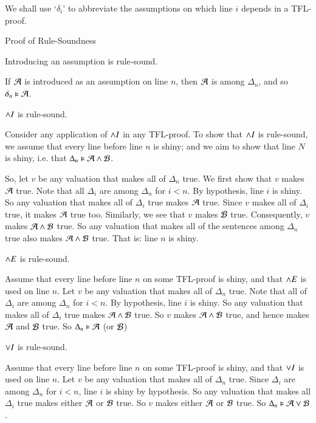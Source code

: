 \documentclass[12pt, a4paper, twoside, openright, titlepage]{book}
\begin{document}
\begin{rmk}{}{}
    We shall use `$\delta_i$' to abbreviate the assumptions on which line $i$ depends in a TFL-proof.
\end{rmk}

\begin{proof*}{Proof of Rule-Soundness}{}
    \begin{claim*}{1}{}
        Introducing an assumption is rule-sound.
    \end{claim*}
    If $\mathcal{A}$ is introduced as an assumption on line $n$, then $\mathcal{A}$ is among $\Delta_n$, and so $\delta_n \vDash \mathcal{A}$.

    \begin{claim*}{2}{}
        $\wedge I$ is rule-sound.
    \end{claim*}
    Consider any application of $\wedge I$ in any TFL-proof. To show that $\wedge I$ is rule-sound, we assume that every line before line $n$ is shiny; and we aim to show that line $N$ is shiny, i.e. that $\Delta_n \vDash \mathcal{A}\wedge \mathcal{B}$.

    So, let $v$ be any valuation that makes all of $\Delta_n$ true. We first show that $v$ makes $\mathcal{A}$ true. Note that all $\Delta_i$ are among $\Delta_n$ for $i< n$. By hypothesis, line $i$ is shiny. So any valuation that makes all of $\Delta_i$ true makes $\mathcal{A}$ true. Since $v$ makes all of $\Delta_i$ true, it makes $\mathcal{A}$ true too. Similarly, we see that $v$ makes $\mathcal{B}$ true. Consequently, $v$ makes $\mathcal{A} \wedge\mathcal{B}$ true. So any valuation that makes all of the sentences among $\Delta_n$ true also makes $\mathcal{A}\wedge\mathcal{B}$ true. That is: line $n$ is shiny.


    \begin{claim*}{3}{}
        $\wedge E$ is rule-sound.
    \end{claim*}
    Assume that every line before line $n$ on some TFL-proof is shiny, and that $\wedge E$ is used on line $n$. Let $v$ be any valuation that makes all of $\Delta_n$ true. Note that all of $\Delta_i$ are among $\Delta_n$ for $i < n$. By hypothesis, line $i$ is shiny. So any valuation that makes all of $\Delta_i$ true makes $\mathcal{A}\wedge\mathcal{B}$ true. So $v$ makes $\mathcal{A}\wedge \mathcal{B}$ true, and hence makes $\mathcal{A}$ and $\mathcal{B}$ true. So $\Delta_n\vDash \mathcal{A}$ (or $\mathcal{B}$)

    \begin{claim*}{4}{}
        $\vee I$ is rule-sound.
    \end{claim*}
    Assume that every line before line $n$ on some TFL-proof is shiny, and that $\vee I$ is used on line $n$. Let $v$ be any valuation that makes all of $\Delta_n$ true. Since $\Delta_i$ are among $\Delta_n$ for $i < n$, line $i$ is shiny by hypothesis. So any valuation that makes all $\Delta_i$ true makes either $\mathcal{A}$ or $\mathcal{B}$ true. So $v$ makes either $\mathcal{A}$ or $\mathcal{B}$ true. So $\Delta_n\vDash \mathcal{A}\vee\mathcal{B}$.
    


\end{proof*}
\end{document}
